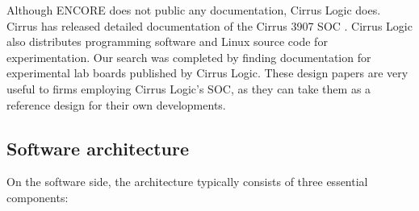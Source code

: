 \documentclass[conference]{IEEEtran}
\newcommand{\nota}[1]{}
\begin{document}
Although ENCORE does not public any documentation, Cirrus Logic does. Cirrus has released detailed documentation of the Cirrus 3907 SOC \cite{cirrus}. Cirrus Logic also distributes programming software and Linux source code for experimentation. Our search was completed by finding documentation for experimental lab boards published by Cirrus Logic. These design papers are very useful to firms employing Cirrus Logic's SOC, as they can take them as a reference design for their own developments.

\subsection{Software architecture}

\nota {
En el lado software, la arquitectura consiste típicamente de tres componentes esenciales :
}

On the software side, the architecture typically consists of three essential components:

\nota {
\begin{itemize}
\item Un gestor de arranque (del inglés ``bootloader'') para un sistema embebido,
que generalmente es Das U-Boot \cite{uboot}. Si no se utiliza U-Boot entonces
es posible encontrar un gestor de arranque de código cerrado.
\item Un kernel Linux o uClinux en caso de ser un sistema sin una
unidad de manejo de memoria, MMU (del inglés ``Memory Management Unit''). 
\item Un sistema de archivos mínimo que contiene, al menos, una biblioteca de C
(generalmente uClibc o eglibc), y busybox, el cual es un pequeño programa ejecutable,
optimizado para sistemas embebidos, que puede realizar las operaciones
de muchas de las utilidades  básicas de UNIX (ls, cp, etc.).
\end{itemize}
}
\end{document}
